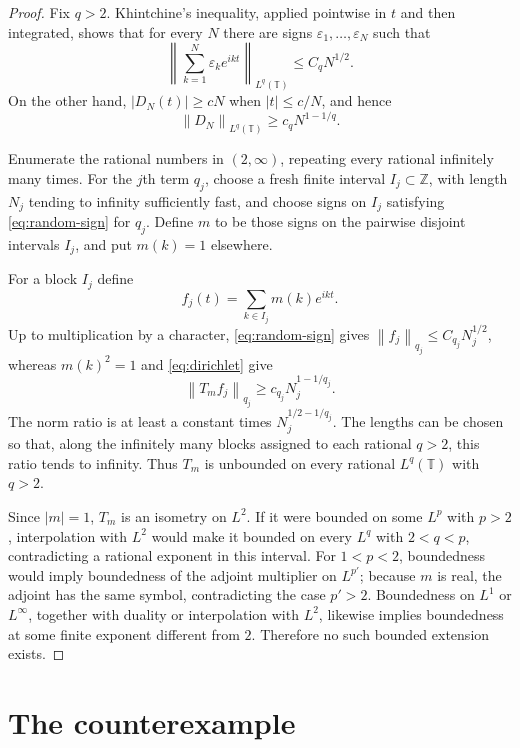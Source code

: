 \documentclass[11pt]{article}
\newcommand{\T}{\mathbb T}
\newcommand{\Z}{\mathbb Z}
\newcommand{\norm}[1]{\left\lVert #1\right\rVert}
\begin{document}
\begin{proof}
Fix $q>2$.  Khintchine's inequality, applied pointwise in $t$ and then
integrated, shows that for every $N$ there are signs
$\varepsilon_1,\ldots,\varepsilon_N$ such that
\begin{equation}\label{eq:random-sign}
  \norm{\sum_{k=1}^N\varepsilon_k e^{ikt}}_{L^q(\T)}
  \leq C_q N^{1/2}.
\end{equation}
On the other hand, $|D_N(t)|\geq cN$ when $|t|\leq c/N$, and hence
\begin{equation}\label{eq:dirichlet}
  \norm{D_N}_{L^q(\T)}\geq c_q N^{1-1/q}.
\end{equation}

Enumerate the rational numbers in $(2,\infty)$, repeating every rational
infinitely many times.  For the $j$th term $q_j$, choose a fresh finite
interval $I_j\subset\Z$, with length $N_j$ tending to infinity sufficiently
fast, and choose signs on $I_j$ satisfying \eqref{eq:random-sign} for $q_j$.
Define $m$ to be those signs on the pairwise disjoint intervals $I_j$, and put
$m(k)=1$ elsewhere.

For a block $I_j$ define
\[
  f_j(t)=\sum_{k\in I_j}m(k)e^{ikt}.
\]
Up to multiplication by a character, \eqref{eq:random-sign} gives
$\norm{f_j}_{q_j}\leq C_{q_j}N_j^{1/2}$, whereas $m(k)^2=1$ and
\eqref{eq:dirichlet} give
\[
  \norm{T_m f_j}_{q_j}\geq c_{q_j}N_j^{1-1/q_j}.
\]
The norm ratio is at least a constant times
$N_j^{1/2-1/q_j}$.  The lengths can be chosen so that, along the infinitely
many blocks assigned to each rational $q>2$, this ratio tends to infinity.
Thus $T_m$ is unbounded on every rational $L^q(\T)$ with $q>2$.

Since $|m|=1$, $T_m$ is an isometry on $L^2$.  If it were bounded on some
$L^p$ with $p>2$, interpolation with $L^2$ would make it bounded on every
$L^q$ with $2<q<p$, contradicting a rational exponent in this interval.
For $1<p<2$, boundedness would imply boundedness of the adjoint multiplier
on $L^{p'}$; because $m$ is real, the adjoint has the same symbol, contradicting
the case $p'>2$.  Boundedness on $L^1$ or $L^\infty$, together with duality or
interpolation with $L^2$, likewise implies boundedness at some finite exponent
different from $2$.  Therefore no such bounded extension exists.
\end{proof}

\section*{The counterexample}
\end{document}
